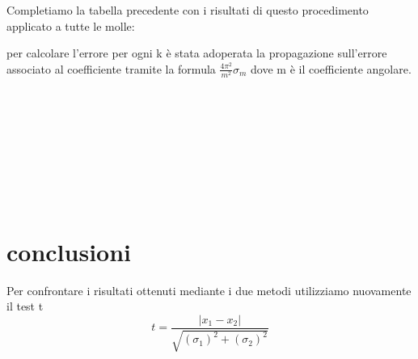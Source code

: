 \documentclass[a4paper]{article}
\theoremstyle{definition}
\begin{document}
Completiamo la tabella precedente con i risultati di questo procedimento applicato a tutte le molle:\\
\begin{figure}[!htbp]
\end{figure}

per calcolare l'errore per ogni k è stata adoperata la propagazione sull'errore associato al coefficiente tramite la formula \(\frac{4\pi^{2}}{m^{2}}\sigma_{m}\) dove m è il coefficiente angolare.\\\\\\\\\\\\\\\\\\
\section*{conclusioni}
Per confrontare i risultati ottenuti mediante i due metodi utilizziamo nuovamente il test t
	\[t = \frac{\left |x_{1}-x_{2}  \right |}{\sqrt{(\sigma_{1})^{2}+(\sigma_{2})^{2}}}\]

\begin{figure}[!htbp]
\end{figure}



	
\end{document}
